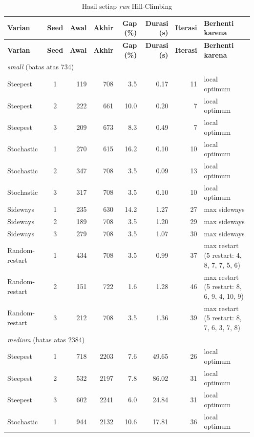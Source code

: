 {\scriptsize\setlength{\tabcolsep}{4pt}
\begin{longtable}{l c r r r r r p{3.6cm}}
\caption{Hasil setiap \textit{run} Hill-Climbing}\label{tab:hc-runs}\\
\toprule
\textbf{Varian} & \textbf{Seed} & \textbf{Awal} & \textbf{Akhir} & \textbf{Gap (\%)} & \textbf{Durasi (s)} & \textbf{Iterasi} & \textbf{Berhenti karena} \\
\endfirsthead
\toprule
\textbf{Varian} & \textbf{Seed} & \textbf{Awal} & \textbf{Akhir} & \textbf{Gap (\%)} & \textbf{Durasi (s)} & \textbf{Iterasi} & \textbf{Berhenti karena} \\
\endhead
\midrule
\multicolumn{8}{l}{\textit{small} (batas atas 734)} \\
Steepest & 1 & 119 & 708 & 3.5 & 0.17 & 11 & local optimum \\
Steepest & 2 & 222 & 661 & 10.0 & 0.20 & 7 & local optimum \\
Steepest & 3 & 209 & 673 & 8.3 & 0.49 & 7 & local optimum \\
Stochastic & 1 & 270 & 615 & 16.2 & 0.10 & 10 & local optimum \\
Stochastic & 2 & 347 & 708 & 3.5 & 0.09 & 13 & local optimum \\
Stochastic & 3 & 317 & 708 & 3.5 & 0.10 & 10 & local optimum \\
Sideways & 1 & 235 & 630 & 14.2 & 1.27 & 27 & max sideways \\
Sideways & 2 & 189 & 708 & 3.5 & 1.20 & 29 & max sideways \\
Sideways & 3 & 279 & 708 & 3.5 & 1.07 & 30 & max sideways \\
Random-restart & 1 & 434 & 708 & 3.5 & 0.99 & 37 & max restart (5 restart: 4, 8, 7, 7, 5, 6) \\
Random-restart & 2 & 151 & 722 & 1.6 & 1.28 & 46 & max restart (5 restart: 8, 6, 9, 4, 10, 9) \\
Random-restart & 3 & 212 & 708 & 3.5 & 1.36 & 39 & max restart (5 restart: 8, 7, 6, 3, 7, 8) \\
\midrule
\multicolumn{8}{l}{\textit{medium} (batas atas 2384)} \\
Steepest & 1 & 718 & 2203 & 7.6 & 49.65 & 26 & local optimum \\
Steepest & 2 & 532 & 2197 & 7.8 & 86.02 & 31 & local optimum \\
Steepest & 3 & 602 & 2241 & 6.0 & 24.84 & 31 & local optimum \\
Stochastic & 1 & 944 & 2132 & 10.6 & 17.81 & 36 & local optimum \\

\end{longtable}}
